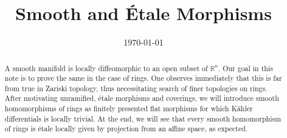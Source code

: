 \documentclass[letterpaper,10pt,twoside]{amsart}
\title{Smooth and \'Etale Morphisms}
\date{\today}
\newcommand{\R}[0]{\mathbb{R}}
\theoremstyle{proposition}
\theoremstyle{definition}
\theoremstyle{theorem}
\theoremstyle{definition}
\theoremstyle{definition}
\theoremstyle{definition}
\theoremstyle{lemma}
\theoremstyle{definition}
\theoremstyle{definition}
\theoremstyle{corollary}
\theoremstyle{definition}
\begin{document}
	\maketitle
	\begin{abstract}
		A smooth manifold is locally diffeomorphic to an open subset of $\R^{n}$. Our goal in this note is to prove the same in the case of rings. One observes immediately that this is far from true in Zariski topology, thus necessitating search of finer topologies on rings. After motivating unramified, \'etale morphisms and coverings, we will introduce smooth homomorphisms of rings as finitely presented flat morphisms for which K\"ahler differentials is locally trivial. At the end, we will see that every smooth homomorphism of rings is \'etale locally given by projection from an affine space, as expected.
	\end{abstract}
	\tableofcontents
\end{document}
